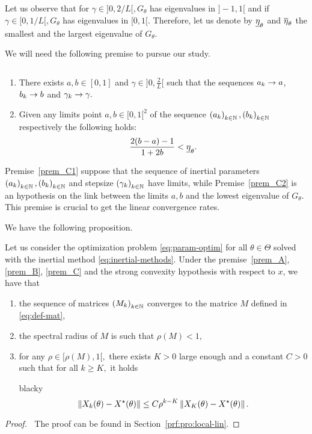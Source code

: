  Let us observe that for $\gamma\in]0,2/L[, G_{\theta}$ has eigenvalues in $]-1,1[$ and if $\gamma\in[0,1/L[, G_{\theta}$ has eigenvalues in $[0,1[$. Therefore, let us denote by $\underline{\eta}_{\theta}$ and $\overline{\eta}_{\theta}$ the smallest and the largest eigenvalue of $G_{\theta}$. 


We will need the following premise to pursue our study. 
\begin{premise}\label{prem_C} $~$
\begin{enumerate}[label=(C.\arabic*)]
 \item \label{prem_C1} There exists $a,b\in [0,1]$ and $\gamma\in]0,\frac{2}{L}[$ such that the sequences $a_{k} \to a$, $b_{k} \to b$ and $\gamma_{k}\to \gamma.$ 
 \item\label{prem_C2} Given any limits point $a,b\in[0,1[^2$ of the sequence $\left(a_{k}\right)_{k\in\mathbb{N}},\left(b_{k}\right)_{k\in\mathbb{N}}$ respectively the following holds:  
 \[
 \frac{2(b-a)-1}{1+2b}<\underline{\eta}_{\theta}.
 \]
\end{enumerate}
\end{premise}
\begin{remark} Premise~\ref{prem_C1} suppose that  the sequence of inertial parameters $\left(a_{k}\right)_{k\in\mathbb{N}}, \left(b_{k}\right)_{k\in\mathbb{N}}$ and stepsize $\left(\gamma_{k}\right)_{k\in\mathbb{N}}$  have  limits, while Premise~\ref{prem_C2} is an hypothesis on the link between the limits $a,b$ and the lowest eigenvalue of $G_{\theta}$. This premise is crucial to get the linear convergence rates.  
\end{remark}


We have the following proposition.
\begin{proposition}\label{pro:local-lin} Let us consider the optimization problem \eqref{eq:param-optim} for all $\theta\in\Theta$ solved with the inertial method \eqref{eq:inertial-methods}. Under the premise~\ref{prem_A}, \ref{prem_B}, \ref{prem_C} and the strong convexity hypothesis with respect to $x$, we have  that

\begin{enumerate}
\item\label{pro:local-lin1}  the sequence of matrices $\left(M_k\right)_{k\in\mathbb{N}}$ converges to the matrice $M$ defined in \eqref{eq:def-mat},

\item \label{pro:local-lin2} the spectral radius of $M$ is such that $\rho(M)<1,$

\item\label{pro:local-lin3} for any $\rho\in[\rho(M),1[,$ there exists $K>0$ large enough and a constant $C>0$ such that for all $k\geq K,$ it holds 
\begin{centerbox}{black}{}y
\begin{equation}\label{eq:local-lin}
	\left\Vert {X_k(\theta)-X^{\star}(\theta)} \right\Vert\leq C\rho^{k-K}\left\Vert {X_K(\theta)-X^{\star}(\theta)} \right\Vert.
\end{equation}
\end{centerbox}

\end{enumerate}
\end{proposition}
\begin{proof}$~$
The proof can be found in Section~\ref{prf:pro:local-lin}.
\end{proof}



